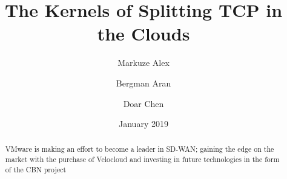 \documentclass[newfonts=false,format=sigconf,10pt,letterpaper]{acmart}
\title{The Kernels of Splitting TCP in the Clouds}
\author{Markuze Alex}
\affiliation{%
  \institution{VMware Research}
  \country{Israel}
}
\author{Bergman Aran}
\affiliation{%
  \institution{VMware Research}
  \country{Israel}
}
\author{Doar Chen}
\affiliation{%
  \institution{VMware Research}
  \country{Israel}
}
\date{January 2019}
\begin{document}
\begin{abstract}
VMware is making an effort to become a leader in SD-WAN; gaining the edge on the market with the purchase of Velocloud and investing in future technologies in the form of the CBN project ~\cite{Elastic, CDD}

\end{abstract}

\maketitle







\end{document}
